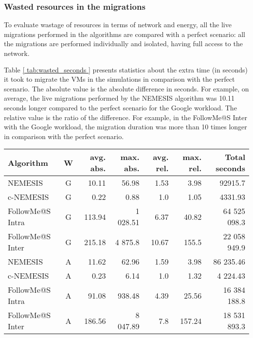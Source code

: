 \subsubsection{Wasted resources in the migrations}

To evaluate wastage of resources in terms of network and energy, all the live migrations performed in the algorithms are compared with a perfect scenario: all the migrations are performed individually and isolated, having full access to the network.

Table \ref{ tab:wasted_seconds } presents statistics about the extra time
(in seconds) it took to migrate the VMs in the simulations in comparison with the perfect scenario. The absolute
value is the absolute difference in seconds. For example, on average,
the live migrations performed by the NEMESIS algorithm was 10.11 seconds longer compared to the perfect scenario for the Google workload. The
relative value is the ratio of the difference. For example, in the
FollowMe@S Inter with the Google workload, the migration duration was
more than 10 times longer in comparison with the perfect scenario.


\begin{table*}[!ht]

\caption{Extra seconds during migrations compared to the case when there is no congestion, where ``W'' stands for ``Workload'', ``G'' for Google and, ``A'' for Azure. ``avg.'' for the average of the observations, ``max.'' for the maximum value, ``abs.'' for the absolute value, and ``rel.'' for the relative value.} \label{ tab:wasted_seconds } \centering
\begin{tabular}{|l|c|r|r|r|r|r|}
  \hline  
  \textbf{Algorithm} & \textbf{W}  & \textbf{avg. abs.} &  \textbf{max. abs.} & \textbf{avg. rel.} &  \textbf{max. rel.} &  \textbf{Total seconds} \\
  
  \hline
  NEMESIS  & G & 10.11  & 56.98 & 1.53 & 3.98  & 92915.7 \\
  \hline
  c-NEMESIS & G & 0.22  & 0.88 & 1.0 & 1.05  & 4331.93 \\
  \hline
  FollowMe@S Intra & G & 113.94  & 1 028.51 &  6.37  & 40.82  & 64 525 098.3 \\
  \hline
  FollowMe@S Inter & G & 215.18  & 4 875.8 & 10.67 & 155.5  & 22 058 949.9\\
  \hline
  NEMESIS  & A & 11.62  & 62.96 & 1.59 & 3.98  & 86 235.46 \\
  \hline
  c-NEMESIS & A &  0.23 & 6.14   & 1.0 & 1.32  & 4 224.43\\
  \hline
  FollowMe@S Intra & A & 91.08  & 938.48 & 4.39 & 25.56  & 16 384 188.8  \\
  \hline
  FollowMe@S Inter & A & 186.56  & 8 047.89 & 7.8 & 157.24  & 18 531 893.3 \\
  \hline

\end{tabular}

\end{table*}

